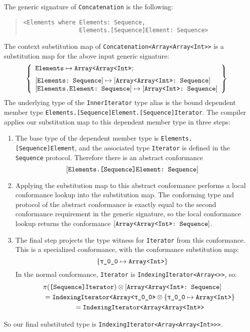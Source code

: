 \documentclass[../generics]{subfiles}
\begin{document}
\begin{example}
The generic signature of \texttt{Concatenation} is the following:
\begin{quote}
\begin{verbatim}
<Elements where Elements: Sequence,
                Elements.[Sequence]Element: Sequence>
\end{verbatim}
\end{quote}
The context substitution map of \texttt{Concatenation<Array<Array<Int>>} is a substitution map for the above input generic signature:
\[
\SubstMapLongC{
\SubstType{Elements}{Array<Array<Int>>}
}{
\SubstConf{Elements}{Array<Array<Int>>}{Sequence}\\
\SubstConf{Elements.Element}{Array<Int>}{Sequence}
}
\]
The underlying type of the \texttt{InnerIterator} type alias is the bound dependent member type \verb|Elements.[Sequence]Element.[Sequence]Iterator|. The compiler applies our substitution map to this dependent member type in three steps:
\begin{enumerate}
\item The base type of the dependent member type is \verb|Elements.[Sequence]Element|, and the associated type \texttt{Iterator} is defined in the \texttt{Sequence} protocol. Therefore there is an abstract conformance
\[[\texttt{Elements.[Sequence]Element:~Sequence}]\]
\item Applying the substitution map to this abstract conformance performs a local conformance lookup into the substitution map. The conforming type and protocol of the abstract conformance is exactly equal to the second conformance requirement in the generic signature, so the local conformance lookup returns the conformance $[\texttt{Array<Array<Int>>:~Sequence}]$.
\item The final step projects the type witness for \texttt{Iterator} from this conformance. This is a specialized conformance, with the conformance substitution map:
\[\SubstMap{\SubstType{\ttgp{0}{0}}{Array<Int>}}\]
In the normal conformance, \texttt{Iterator} is \texttt{IndexingIterator<Array<>>}, so:
\begin{gather*}
\AssocType{[Sequence]Iterator}\otimes \ConfReq{Array<Array<Int>>}{Sequence}\\
\qquad {} = \texttt{IndexingIterator<Array<\ttgp{0}{0}>>}\otimes \SubstMap{\SubstType{\ttgp{0}{0}}{Array<Int>}}\\
\qquad {} = \texttt{IndexingIterator<Array<Array<Int>>>}
\end{gather*}
\end{enumerate}
So our final substituted type is \verb|IndexingIterator<Array<Array<Int>>>|.
\end{example}
\end{document}
